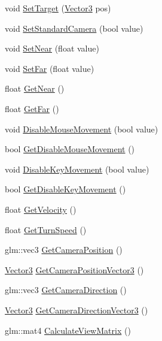 \begin{DoxyCompactItemize}
\item 
void \mbox{\hyperlink{class_camera_a5a7426bc395b1348cfafd4e9d121af41}{Set\+Target}} (\mbox{\hyperlink{struct_vector3}{Vector3}} pos)
\item 
void \mbox{\hyperlink{class_camera_ab0864f4ba7ba25be835288179b253a7d}{Set\+Standard\+Camera}} (bool value)
\item 
void \mbox{\hyperlink{class_camera_a26734bdbf1daea7a931d87ab41718e23}{Set\+Near}} (float value)
\item 
void \mbox{\hyperlink{class_camera_ae259567c7a03f64982178848e5c2dc97}{Set\+Far}} (float value)
\item 
float \mbox{\hyperlink{class_camera_ac84e690c0103031a959c7434cbc18f04}{Get\+Near}} ()
\item 
float \mbox{\hyperlink{class_camera_a44d06d5d21a3075cb59abe1d00505077}{Get\+Far}} ()
\item 
void \mbox{\hyperlink{class_camera_a164c6872bbcdf14cefda7fa8e73ba998}{Disable\+Mouse\+Movement}} (bool value)
\item 
bool \mbox{\hyperlink{class_camera_a520757f86755ee458f4ccc1abb84297e}{Get\+Disable\+Mouse\+Movement}} ()
\item 
void \mbox{\hyperlink{class_camera_ae1e7ad116cf9779f19f572fcf3f64fbd}{Disable\+Key\+Movement}} (bool value)
\item 
bool \mbox{\hyperlink{class_camera_af6e034392072228fc4d6a80f1c3ea5bf}{Get\+Disable\+Key\+Movement}} ()
\item 
float \mbox{\hyperlink{class_camera_ad38a19d516d7a5f1663fb08de222d074}{Get\+Velocity}} ()
\item 
float \mbox{\hyperlink{class_camera_a3111d980c55e40f41ae19daee9a2d2f2}{Get\+Turn\+Speed}} ()
\item 
glm\+::vec3 \mbox{\hyperlink{class_camera_a948a60a6eb780a313ed59690bbaef811}{Get\+Camera\+Position}} ()
\item 
\mbox{\hyperlink{struct_vector3}{Vector3}} \mbox{\hyperlink{class_camera_a94319853194c76e195cc774c32f3bbf4}{Get\+Camera\+Position\+Vector3}} ()
\item 
glm\+::vec3 \mbox{\hyperlink{class_camera_a988589852d490dd0f4824127372464ed}{Get\+Camera\+Direction}} ()
\item 
\mbox{\hyperlink{struct_vector3}{Vector3}} \mbox{\hyperlink{class_camera_a348047d7ebbd504a0da83fc4a6d60809}{Get\+Camera\+Direction\+Vector3}} ()
\item 
glm\+::mat4 \mbox{\hyperlink{class_camera_ab3e898442f97de71f3bbeeebf98082d8}{Calculate\+View\+Matrix}} ()
\end{DoxyCompactItemize}


